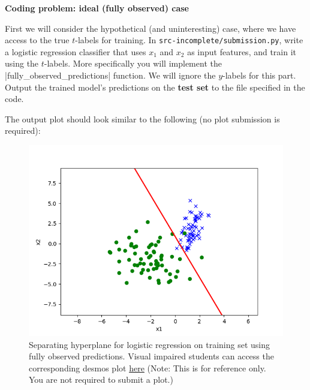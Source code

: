 \item {} \textbf{Coding problem: ideal (fully observed) case}

First we will consider the hypothetical (and uninteresting) case, where we have access to the true
$t$-labels for training. In \texttt{src-incomplete/submission.py}, write a logistic
regression classifier that uses $x_1$ and $x_2$ as input features, and train it
using the $t$-labels. More specifically you will implement the |fully_observed_predictions| function.
We will ignore the $y$-labels for this part. Output the
trained model's predictions on the \textbf{test set} to the file specified in the code.

The output plot should look similar to the following (no plot submission is required):
\begin{figure}[H]
	\centering
	\vspace{2mm}
	\includegraphics[width=0.5\linewidth]{02-posonly/posonly_true_pred.png}
    \caption{Separating hyperplane for logistic regression on training set using fully observed predictions. Visual impaired students can access the corresponding desmos plot \href{https://www.desmos.com/calculator/b3mhbxifly}{here} (Note: This is for reference only.  You are not required to submit a plot.)}
\end{figure}